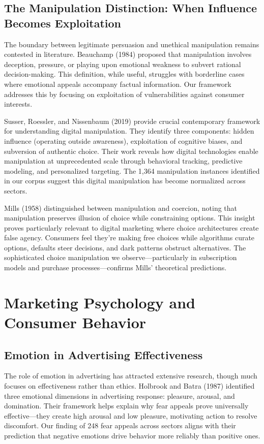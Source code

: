 \subsection{The Manipulation Distinction: When Influence Becomes Exploitation}

The boundary between legitimate persuasion and unethical manipulation remains contested in literature. Beauchamp (1984) proposed that manipulation involves deception, pressure, or playing upon emotional weakness to subvert rational decision-making. This definition, while useful, struggles with borderline cases where emotional appeals accompany factual information. Our framework addresses this by focusing on exploitation of vulnerabilities against consumer interests.

Susser, Roessler, and Nissenbaum (2019) provide crucial contemporary framework for understanding digital manipulation. They identify three components: hidden influence (operating outside awareness), exploitation of cognitive biases, and subversion of authentic choice. Their work reveals how digital technologies enable manipulation at unprecedented scale through behavioral tracking, predictive modeling, and personalized targeting. The 1,364 manipulation instances identified in our corpus suggest this digital manipulation has become normalized across sectors.

Mills (1958) distinguished between manipulation and coercion, noting that manipulation preserves illusion of choice while constraining options. This insight proves particularly relevant to digital marketing where choice architectures create false agency. Consumers feel they're making free choices while algorithms curate options, defaults steer decisions, and dark patterns obstruct alternatives. The sophisticated choice manipulation we observe—particularly in subscription models and purchase processes—confirms Mills' theoretical predictions.

\section{Marketing Psychology and Consumer Behavior}
\label{sec:marketing_psych}

\subsection{Emotion in Advertising Effectiveness}

The role of emotion in advertising has attracted extensive research, though much focuses on effectiveness rather than ethics. Holbrook and Batra (1987) identified three emotional dimensions in advertising response: pleasure, arousal, and domination. Their framework helps explain why fear appeals prove universally effective—they create high arousal and low pleasure, motivating action to resolve discomfort. Our finding of 248 fear appeals across sectors aligns with their prediction that negative emotions drive behavior more reliably than positive ones.

